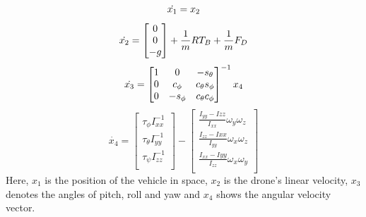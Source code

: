 \begin{equation}
\label{mmControl1}
	\dot{x_1} = x_2	\\
\end{equation}
\begin{equation}
\label{mmControl2}
	\dot{x_2} = \begin{bmatrix}
 	0	\\
 	0	\\
 	-g 	\\
 	\end{bmatrix} + \frac{1}{m}RT_B + \frac{1}{m}F_D \\
\end{equation}
\begin{equation}
\label{mmControl3} 	
 	\dot{x_3} = \begin{bmatrix}
       	1		& 0 		& -s_\theta			\\
       	0 		& c_\phi 	& c_\theta s_\phi 	\\
      	0       & -s_\phi 	& c_\theta c_\phi 	\\
	\end{bmatrix}^{-1}x_4 \\
\end{equation}
\begin{equation}
\label{mmControl4}	
	\dot{x_4} = \begin{bmatrix}
 	\tau _\phi I_{xx}^{-1}		\\
 	\tau _\theta I_{yy}^{-1}	\\
 	\tau _\psi I_{zz}^{-1}		\\ 
 	\end{bmatrix} - \begin{bmatrix}
 	\frac{I_{yy}-I{zz}}{I_{xx}}\omega _y\omega _z	\\
 	\frac{I_{zz}-I{xx}}{I_{yy}}\omega _x\omega _z	\\
 	\frac{I_{xx}-I{yy}}{I_{zz}}\omega _x\omega _y	\\ 
 	\end{bmatrix}
 \end{equation}
Here, $x_1$ is the position of the vehicle in space, $x_2$ is the drone's linear velocity, $x_3$ denotes the angles of pitch, roll and yaw and $x_4$ shows the angular velocity vector.
